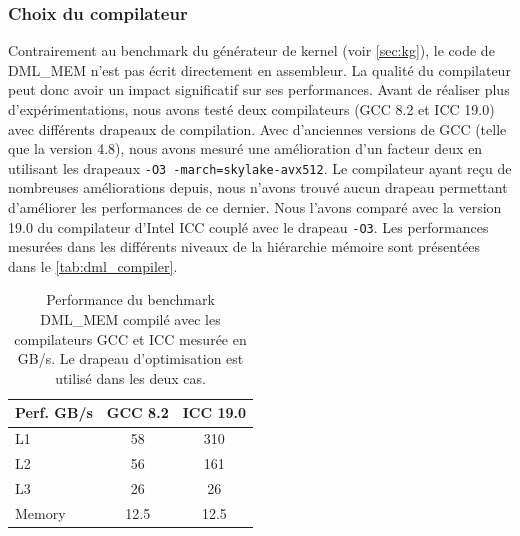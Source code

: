     \subsubsection{Choix du compilateur}
    
        Contrairement au benchmark du générateur de kernel (voir \autoref{sec:kg}), le code de DML\_MEM n'est pas écrit directement en assembleur. La qualité du compilateur peut donc avoir un impact significatif sur ses performances. Avant de réaliser plus d'expérimentations, nous avons testé deux compilateurs (GCC 8.2 et ICC 19.0) avec différents drapeaux de compilation. Avec d'anciennes versions de GCC (telle que la version 4.8), nous avons mesuré une amélioration d'un facteur deux en utilisant les drapeaux \verb|-O3 -march=skylake-avx512|. Le compilateur ayant reçu de nombreuses améliorations depuis, nous n'avons trouvé aucun drapeau permettant d'améliorer les performances de ce dernier. Nous l'avons comparé avec la version 19.0 du compilateur d'Intel ICC couplé avec le drapeau \verb|-O3|. Les performances mesurées dans les différents niveaux de la hiérarchie mémoire sont présentées dans le \autoref{tab:dml_compiler}.

        \begin{table}[h!]
        \centering
        \begin{tabular}{|l|c|c|}
        \hline
        Perf. GB/s & GCC 8.2 & ICC 19.0 \\ \hline
        L1 & 58 & 310 \\ \hline
        L2 & 56 & 161 \\ \hline
        L3 & 26 & 26 \\ \hline
        Memory & 12.5 & 12.5 \\ \hline
        \end{tabular}%
        \caption{Performance du benchmark DML\_MEM compilé avec les compilateurs GCC et ICC mesurée en GB/s. Le drapeau d'optimisation  est utilisé dans les deux cas.}
        \label{tab:dml_compiler}
        \end{table}

